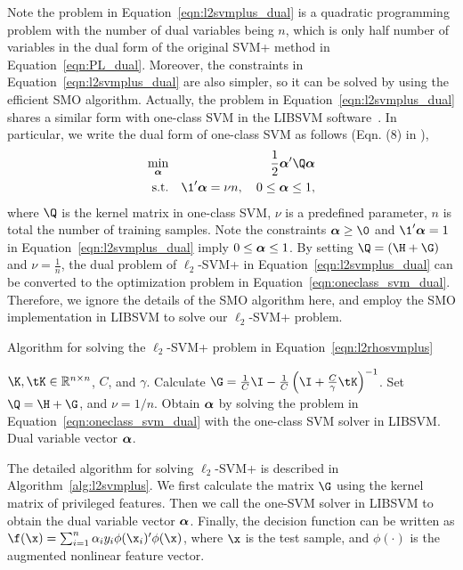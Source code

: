 Note the problem in Equation~\ref{eqn:l2svmplus_dual} is a quadratic programming problem with the number of dual variables being $n$, which is only half number of variables in the dual form of the original SVM+ method in Equation~\ref{eqn:PL_dual}. Moreover, the constraints in Equation~\ref{eqn:l2svmplus_dual} are also simpler, so it can be solved by using the efficient SMO algorithm. Actually, the problem in Equation~\ref{eqn:l2svmplus_dual} shares a similar form with one-class SVM in the LIBSVM software~\citep{libsvm}. In particular, we write the dual form of one-class SVM as follows (Eqn. (8) in \citep{libsvm}),
\begin{eqnarray}\label{eqn:oneclass_svm_dual}
\min_{\ba} && \frac{1}{2}\ba'\Q\ba\\
\mbox{s.t.} && \1'\ba = \nu n, \quad 0\leq \ba \leq 1\nonumber,
\end{eqnarray}
where $\Q$ is the kernel matrix in one-class SVM, $\nu$ is a predefined parameter, $n$ is total the number of training samples.  Note the constraints $\ba \geq \0$ and $\1'\ba = 1$ in Equation~\ref{eqn:l2svmplus_dual} imply $0 \leq \bm{\alpha} \leq 1$. By setting $\Q = (\H + \G)$ and $\nu =  \frac{1}{n}$, the dual problem of $\ell_2$-SVM+ in Equation~\ref{eqn:l2svmplus_dual} can be converted to the optimization problem in Equation~\ref{eqn:oneclass_svm_dual}. Therefore, we ignore the details of the SMO algorithm here, and employ the SMO implementation in LIBSVM to solve our $\ell_2$-SVM+ problem.

\begin{algorithm}[t]
   \caption{Algorithm for solving the $\ell_2$-SVM+ problem in Equation~\ref{eqn:l2rhosvmplus}}
   \label{alg:l2svmplus}
   \begin{algorithmic}[1]
   \REQUIRE  $\K, \tK \in \bbR^{n\times n}$, $C$, and $\gamma$.
   \STATE Calculate $\G = \frac{1}{C}\I - \frac{1}{C}\left(\I+\frac{C}{\gamma}\tK\right)^{-1}$.
   \STATE Set $\Q = \H + \G$, and $\nu = 1/n$.
   \STATE Obtain $\bm{\alpha}$ by solving the problem in Equation~\ref{eqn:oneclass_svm_dual} with the one-class SVM solver in LIBSVM.
   \ENSURE Dual variable vector $\bm{\alpha}$.
\end{algorithmic}
\end{algorithm}

The detailed algorithm for solving $\ell_2$-SVM+ is described in Algorithm~\ref{alg:l2svmplus}. We first calculate the matrix $\G$ using the kernel matrix of privileged features. Then we call the one-SVM solver in LIBSVM to obtain the dual variable vector $\bm{\alpha}$. Finally, the decision function can be written as $\f(\x) = \sum_{i=1}^n\alpha_iy_i\phi(\x_i)'\phi(\x)$, where $\x$ is the test sample, and $\phi(\cdot)$ is the augmented nonlinear feature vector.

